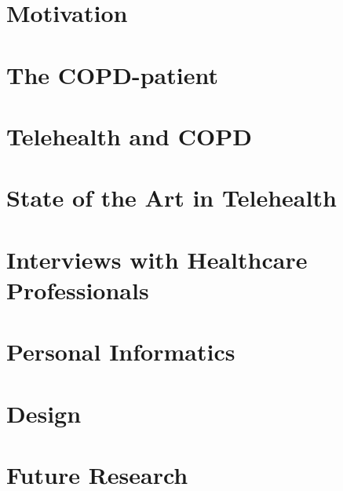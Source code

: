 
\usepackage{booktabs} %


\cleardoublepage
\cleardoublepage

\cleardoublepage

\begin{KeepFromToc}
	\tableofcontents
\end{KeepFromToc}

\chapter{Motivation}


\chapter{The COPD-patient}


\chapter{Telehealth and COPD}


\chapter{State of the Art in Telehealth}


\chapter{Interviews with Healthcare Professionals}


\chapter{Personal Informatics}


\chapter{Design}


\chapter{Future Research}


\label{lastpage}


